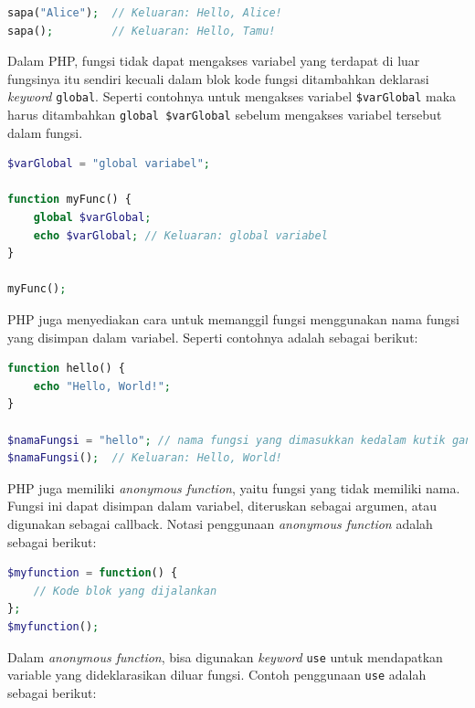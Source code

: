 \documentclass[a4paper,twoside]{article}
\begin{document}
\begin{enumerate}
\begin{itemize}
\begin{lstlisting}[language={php}, caption={Contoh Penggunaan fungsi}, label={kode:5:fungsi_ex}]
sapa("Alice");  // Keluaran: Hello, Alice!
sapa();         // Keluaran: Hello, Tamu!
					\end{lstlisting}

		            Dalam PHP, fungsi tidak dapat mengakses variabel yang terdapat di luar fungsinya itu sendiri kecuali dalam blok kode fungsi ditambahkan deklarasi \textit{keyword} \verb|global|. Seperti contohnya untuk mengakses variabel \verb|$varGlobal| maka harus ditambahkan \verb|global $varGlobal| sebelum mengakses variabel tersebut dalam fungsi.

		            \begin{lstlisting}[language={php}, caption={Contoh fungsi dengan variabel global}, label={kode:5:fungsi_exglobal}]
$varGlobal = "global variabel";

function myFunc() {
	global $varGlobal;
	echo $varGlobal; // Keluaran: global variabel
}

myFunc();
					\end{lstlisting}

		            PHP juga menyediakan cara untuk memanggil fungsi menggunakan nama fungsi yang disimpan dalam variabel. Seperti contohnya adalah sebagai berikut:

		            \begin{lstlisting}[language={php}, caption={Contoh pemanggil fungsi menggunakan variabel}, label={kode:5:fungsi_exname}]
function hello() {
	echo "Hello, World!";
}

$namaFungsi = "hello"; // nama fungsi yang dimasukkan kedalam kutik ganda
$namaFungsi();  // Keluaran: Hello, World!
					\end{lstlisting}

		            PHP juga memiliki \textit{anonymous function}, yaitu fungsi yang tidak memiliki nama. Fungsi ini dapat disimpan dalam variabel, diteruskan sebagai argumen, atau digunakan sebagai callback. Notasi penggunaan \textit{anonymous function} adalah sebagai berikut:

		            \begin{lstlisting}[language={php}, caption={Contoh anonymous function}, label={kode:5:fungsi_exanon}]
$myfunction = function() {
	// Kode blok yang dijalankan
};
$myfunction();
					\end{lstlisting}

		            Dalam \textit{anonymous function}, bisa digunakan \textit{keyword} \verb|use| untuk mendapatkan variable yang dideklarasikan diluar fungsi. Contoh penggunaan \verb|use| adalah sebagai berikut:



\end{itemize}
\end{enumerate}
\end{document}

